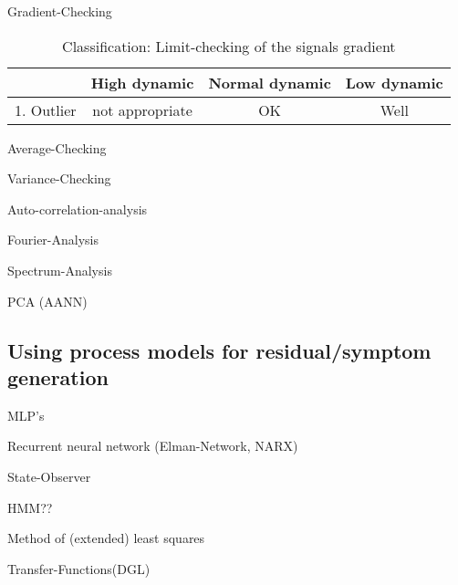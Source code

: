 \documentclass[a4paper,11pt]{article}
\begin{document}
Gradient-Checking

 \begin{table}[h]
 \caption{Classification: \glqq Limit-checking of the signals gradient \grqq}
 \begin{tabular}{c|c|c|c}
                    & High dynamic        & Normal dynamic        & Low dynamic \\  \hline
 1. Outlier         & not appropriate     &      OK               &       Well
 \end{tabular}
 \label{tab:lc_gradient}
 \end{table}

Average-Checking

Variance-Checking

Auto-correlation-analysis

Fourier-Analysis

Spectrum-Analysis

PCA (AANN)


\subsection{Using process models for residual/symptom generation}
  
MLP's

Recurrent neural network (Elman-Network, NARX)

State-Observer

HMM??

Method of (extended) least squares

Transfer-Functions(DGL)
\end{document}
